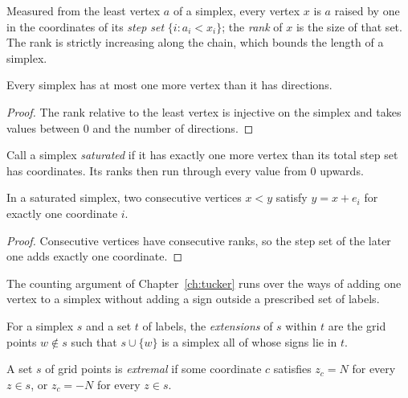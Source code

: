 Measured from the least vertex $a$ of a simplex, every vertex $x$ is $a$ raised by one
in the coordinates of its \emph{step set} $\{ i : a_i < x_i \}$; the \emph{rank} of
$x$ is the size of that set. The rank is strictly increasing along the chain, which
bounds the length of a simplex.

\begin{lemma}
\label{lem:card-simplex}
\leanok
{}
Every simplex has at most one more vertex than it has directions.
\end{lemma}
\begin{proof}
\leanok
The rank relative to the least vertex is injective on the simplex and takes values
between $0$ and the number of directions.
\end{proof}

Call a simplex \emph{saturated} if it has exactly one more vertex than its total step
set has coordinates. Its ranks then run through every value from $0$ upwards.

\begin{lemma}
\label{lem:unit-step}
\leanok
In a saturated simplex, two consecutive vertices $x < y$ satisfy $y = x + e_i$ for
exactly one coordinate $i$.
\end{lemma}
\begin{proof}
\leanok
{}
Consecutive vertices have consecutive ranks, so the step set of the later one adds
exactly one coordinate.
\end{proof}

The counting argument of Chapter~\ref{ch:tucker} runs over the ways of adding one
vertex to a simplex without adding a sign outside a prescribed set of labels.

\begin{definition}[Extensions]
\label{def:extensions}
\leanok
{}
For a simplex $s$ and a set $t$ of labels, the \emph{extensions} of $s$ within $t$ are
the grid points $w \notin s$ such that $s \cup \{w\}$ is a simplex all of whose signs
lie in $t$.
\end{definition}

\begin{definition}
\label{def:extremal}
\leanok
{}
A set $s$ of grid points is \emph{extremal} if some coordinate $c$ satisfies $z_c = N$
for every $z \in s$, or $z_c = -N$ for every $z \in s$.
\end{definition}

